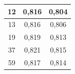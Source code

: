 \documentclass{classrep}
\begin{document}
{\begin{table}[H]
\begin{center}
\begin{tabular}{|c|c|c|}
12                       & 0,816                                                                      & 0,804                                                                          \\ \hline
13                       & 0,816                                                                      & 0,806                                                                          \\ \hline
19                       & 0,819                                                                      & 0,813                                                                          \\ \hline
37                       & 0,821                                                                      & 0,815                                                                          \\ \hline
59                       & 0,817                                                                      & 0,814                                                                          \\ \hline
\end{tabular}
\end{center}
\end{table}
}
\end{document}
